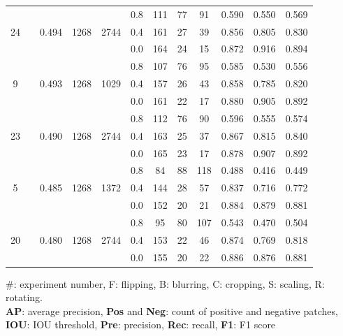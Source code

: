 \documentclass[preprint,12pt,authoryear]{elsarticle}
\begin{document}
\begin{table}
\begin{tabular}{c >{\centering\arraybackslash}m{2.2cm} c c  c ccc c c c c}
\multirow{3}{*}{24} &  \multirow{3}{*}{B, S, R} & \multirow{3}{*}{0.494 } & \multirow{3}{*}{1268} & \multirow{3}{*}{2744} &0.8 & 111 & 77 & 91 & 0.590  & 0.550  & 0.569 \\
 &  & &  &   & 0.4 & 161 & 27 & 39 & 0.856  & 0.805  & 0.830 \\
 &  & &  &   & 0.0 & 164 & 24 & 15 & 0.872  & 0.916  & 0.894 \\
\midrule
\multirow{3}{*}{9} &  \multirow{3}{*}{B} & \multirow{3}{*}{0.493 } & \multirow{3}{*}{1268} & \multirow{3}{*}{1029} &0.8 & 107 & 76 & 95 & 0.585  & 0.530  & 0.556 \\
 &  & &  &   & 0.4 & 157 & 26 & 43 & 0.858  & 0.785  & 0.820 \\
 &  & &  &   & 0.0 & 161 & 22 & 17 & 0.880  & 0.905  & 0.892 \\
\midrule
\multirow{3}{*}{23} &  \multirow{3}{*}{B, C, R} & \multirow{3}{*}{0.490 } & \multirow{3}{*}{1268} & \multirow{3}{*}{2744} &0.8 & 112 & 76 & 90 & 0.596  & 0.555  & 0.574 \\
 &  & &  &   & 0.4 & 163 & 25 & 37 & 0.867  & 0.815  & 0.840 \\
 &  & &  &   & 0.0 & 165 & 23 & 17 & 0.878  & 0.907  & 0.892 \\
\midrule
\multirow{3}{*}{5} &  \multirow{3}{*}{R} & \multirow{3}{*}{0.485 } & \multirow{3}{*}{1268} & \multirow{3}{*}{1372} &0.8 & 84 & 88 & 118 & 0.488  & 0.416  & 0.449 \\
 &  & &  &   & 0.4 & 144 & 28 & 57 & 0.837  & 0.716  & 0.772 \\
 &  & &  &   & 0.0 & 152 & 20 & 21 & 0.884  & 0.879  & 0.881 \\
\midrule
\multirow{3}{*}{20} &  \multirow{3}{*}{F, C, R} & \multirow{3}{*}{0.480 } & \multirow{3}{*}{1268} & \multirow{3}{*}{2744} &0.8 & 95 & 80 & 107 & 0.543  & 0.470  & 0.504 \\
 &  & &  &   & 0.4 & 153 & 22 & 46 & 0.874  & 0.769  & 0.818 \\
 &  & &  &   & 0.0 & 155 & 20 & 22 & 0.886  & 0.876  & 0.881 \\

\bottomrule
\end{tabular}
\raggedright \#: experiment number, F: flipping, B: blurring, C: cropping, S: scaling, R: rotating.  \\\textbf{AP}: average precision, \textbf{Pos} and \textbf{Neg}: count of positive and negative patches, \textbf{IOU}: IOU threshold, \textbf{Pre}: precision, \textbf{Rec}: recall, \textbf{F1}: F1 score

\end{table}
\end{document}
